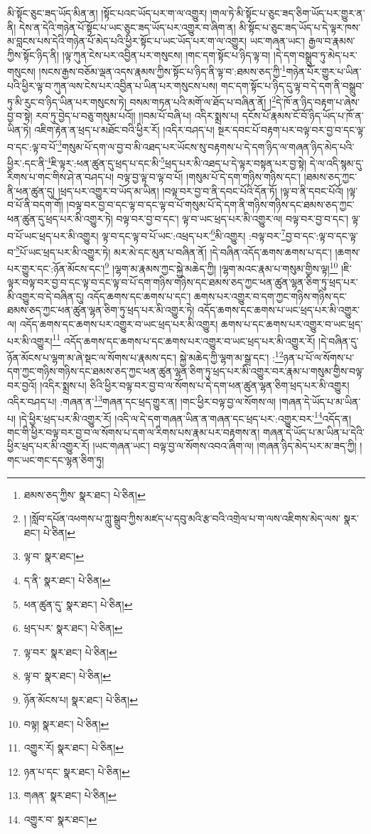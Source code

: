 མི་སྟོང་ཅུང་ཟད་ཡོད་མིན་ན། །སྟོང་པའང་ཡོད་པར་ག་ལ་འགྱུར། །གལ་ཏེ་མི་སྟོང་པ་ཅུང་ཟད་ཅིག་ཡོད་པར་གྱུར་ན་ནི། དེས་ན་དེའི་གཉེན་པོ་སྟོང་པ་ཡང་ཅུང་ཟད་ཡོད་པར་འགྱུར་བ་ཞིག་ན། མི་སྟོང་པ་ཅུང་ཟད་ཡོད་པ་དེ་ལྟར་ཁས་མ་བླངས་པས་དེའི་གཉེན་པོ་མེད་པའི་ཕྱིར་སྟོང་པ་ཡང་ཡོད་པར་ག་ལ་འགྱུར། ཡང་གཞན་ཡང་། རྒྱལ་བ་རྣམས་ཀྱིས་སྟོང་ཉིད་ནི། །ལྟ་ཀུན་ངེས་པར་འབྱིན་པར་གསུངས། །གང་དག་སྟོང་པ་ཉིད་ལྟ་བ། །དེ་དག་བསྒྲུབ་ཏུ་མེད་པར་གསུངས། །སངས་རྒྱས་བཅོམ་ལྡན་འདས་རྣམས་ཀྱིས་སྟོང་པ་ཉིད་ནི་ལྟ་བ་:ཐམས་ཅད་ཀྱི་\footnote{ཐམས་ཅད་ཀྱིས་  སྣར་ཐང་།  པེ་ཅིན། }གཉེན་པོར་གྱུར་པ་ཡིན་པའི་ཕྱིར་ལྟ་བ་ཀུན་ལས་ངེས་པར་འབྱིན་པ་ཡིན་པར་གསུངས་པས། གང་དག་སྟོང་པ་ཉིད་དུ་ལྟ་བ་དེ་དག་ནི་བསྒྲུབ་ཏུ་མི་རུང་བ་ཉིད་ཡིན་པར་གསུངས་ཏེ། བསམ་གཏན་པའི་མགོ་ལ་ཐོད་པ་བཞིན་ནོ། །\footnote{། །སློབ་དཔོན་འཕགས་པ་ཀླུ་སྒྲུབ་ཀྱིས་མཛད་པ་དབུ་མའི་རྩ་བའི་འགྲེལ་པ་ག་ལས་འཇིགས་མེད་ལས་  སྣར་ཐང་།  པེ་ཅིན། }དེ་ཁོ་ན་ཉིད་བརྟག་པ་ཞེས་བྱ་བ་སྟེ། རབ་ཏུ་བྱེད་པ་བཅུ་གསུམ་པའོ།། །།བམ་པོ་བཞི་པ། འདིར་སྨྲས་པ། དངོས་པོ་རྣམས་ངོ་བོ་ཉིད་ཡོད་པ་ཁོ་ན་ཡིན་ཏེ། འཇིག་རྟེན་ན་ཕྲད་པ་མཐོང་བའི་ཕྱིར་རོ། །འདིར་བཤད་པ། སྔར་དབང་པོ་བརྟག་པར་བལྟ་བར་བྱ་བ་དང་ལྟ་བ་དང་:ལྟ་བ་པོ་\footnote{ལྟ་བ་  སྣར་ཐང་། }གསུམ་པོ་དག་ལ་བྱ་བ་མི་འཐད་པར་ཡོངས་སུ་བརྟགས་པ་དེ་དག་ཉིད་ལ་གཞན་ཉིད་མེད་པའི་ཕྱིར་:དང་ནི་\footnote{ད་ནི་  སྣར་ཐང་།  པེ་ཅིན། }ཇི་ལྟར་:ཕན་ཚུན་དུ་ཕྲད་པ་དང་མི་\footnote{ཕན་ཚུན་དུ་  སྣར་ཐང་།  པེ་ཅིན། }ཕྲད་པར་མི་འཐད་པ་དེ་ལྟར་བསྟན་པར་བྱ་སྟེ། དེ་ལ་འདི་སྙམ་དུ་རིགས་པ་གང་གིས་ཤེ་ན་བཤད་པ། བལྟ་བྱ་ལྟ་བ་ལྟ་བ་པོ། །གསུམ་པོ་དེ་དག་གཉིས་གཉིས་དང་། །ཐམས་ཅད་ཀྱང་ནི་ཕན་ཚུན་དུ། །ཕྲད་པར་འགྱུར་བ་ཡོད་མ་ཡིན། །བལྟ་བར་བྱ་བ་ནི་དབང་པོའི་དོན་ཏོ། །ལྟ་བ་ནི་དབང་པོའོ། །ལྟ་བ་པོ་ནི་བདག་གོ། །བལྟ་བར་བྱ་བ་དང་ལྟ་བ་དང་ལྟ་བ་པོ་གསུམ་པོ་དེ་དག་ནི་གཉིས་གཉིས་དང་ཐམས་ཅད་ཀྱང་ཕན་ཚུན་དུ་ཕྲད་པར་མི་འགྱུར་ཏེ། བལྟ་བར་བྱ་བ་དང་། ལྟ་བ་ཡང་ཕྲད་པར་མི་འགྱུར་ལ། བལྟ་བར་བྱ་བ་དང་། ལྟ་བ་པོ་ཡང་ཕྲད་པར་མི་འགྱུར། ལྟ་བ་དང་ལྟ་བ་པོ་ཡང་:འཕྲད་པར་\footnote{ཕྲད་པར་  སྣར་ཐང་།  པེ་ཅིན། }མི་འགྱུར། :བལྟ་བར་\footnote{ལྟ་བར་  སྣར་ཐང་།  པེ་ཅིན། }བྱ་བ་དང་:ལྟ་བ་དང་ལྟ་བ་\footnote{ལྟ་བ་  སྣར་ཐང་།  པེ་ཅིན། }པོ་ཡང་ཕྲད་པར་མི་འགྱུར་ཏེ། མར་མེ་དང་མུན་པ་བཞིན་ནོ། །དེ་བཞིན་འདོད་ཆགས་ཆགས་པ་དང་། །ཆགས་པར་གྱུར་དང་:ཉོན་མོངས་དང་།\footnote{ཉོན་མོངས་པ།  སྣར་ཐང་།  པེ་ཅིན། } །ལྷག་མ་རྣམས་ཀྱང་སྐྱེ་མཆེད་ཀྱི། །ལྷག་མའང་རྣམ་པ་གསུམ་གྱིས་ལྟ།\footnote{བལྟ།  སྣར་ཐང་།  པེ་ཅིན། } །ཇི་ལྟར་བལྟ་བར་བྱ་བ་དང་ལྟ་བ་དང་ལྟ་བ་པོ་དག་གཉིས་གཉིས་དང་ཐམས་ཅད་ཀྱང་ཕན་ཚུན་ལྷན་ཅིག་ཏུ་ཕྲད་པར་མི་འགྱུར་བ་དེ་བཞིན་དུ། འདོད་ཆགས་དང་ཆགས་པ་དང་། ཆགས་པར་འགྱུར་བ་དག་ཀྱང་གཉིས་གཉིས་དང་ཐམས་ཅད་ཀྱང་ཕན་ཚུན་ལྷན་ཅིག་ཏུ་ཕྲད་པར་མི་འགྱུར་ཏེ། འདོད་ཆགས་དང་ཆགས་པ་ཡང་ཕྲད་པར་མི་འགྱུར་ལ། འདོད་ཆགས་དང་ཆགས་པར་འགྱུར་བ་ཡང་ཕྲད་པར་མི་འགྱུར། ཆགས་པ་དང་ཆགས་པར་འགྱུར་བ་ཡང་ཕྲད་པར་མི་འགྱུར།\footnote{འགྱུར་རོ།  སྣར་ཐང་།  པེ་ཅིན། } འདོད་ཆགས་དང་ཆགས་པ་དང་ཆགས་པར་འགྱུར་བ་ཡང་ཕྲད་པར་མི་འགྱུར་རོ། །དེ་བཞིན་དུ་ཉོན་མོངས་པ་ལྷག་མ་ཞེ་སྡང་ལ་སོགས་པ་རྣམས་དང་། སྐྱེ་མཆེད་ཀྱི་ལྷག་མ་སྒྲ་དང་། :\footnote{ཉན་པ་དང་  སྣར་ཐང་།  པེ་ཅིན། }ཉན་པ་པོ་ལ་སོགས་པ་དག་ཀྱང་གཉིས་གཉིས་དང་ཐམས་ཅད་ཀྱང་ཕན་ཚུན་ལྷན་ཅིག་ཏུ་ཕྲད་པར་མི་འགྱུར་བར་རྣམ་པ་གསུམ་གྱིས་བལྟ་བར་བྱའོ། །འདིར་སྨྲས་པ། ཅིའི་ཕྱིར་བལྟ་བར་བྱ་བ་ལ་སོགས་པ་དེ་དག་ཕན་ཚུན་ལྷན་ཅིག་ཕྲད་པར་མི་འགྱུར། འདིར་བཤད་པ། :གཞན་ན་\footnote{གཞན་  སྣར་ཐང་།  པེ་ཅིན། }གཞན་དང་ཕྲད་གྱུར་ན། །གང་ཕྱིར་བལྟ་བྱ་ལ་སོགས་ལ། །གཞན་དེ་ཡོད་པ་མ་ཡིན་པ། །དེ་ཕྱིར་ཕྲད་པར་མི་འགྱུར་རོ། །འདི་ལ་དེ་དག་གཞན་ཡིན་ན་གཞན་དང་ཕྲད་པར་:འགྱུར་བར་\footnote{འགྱུར་བ་  སྣར་ཐང་། }འདོད་ན། གང་གི་ཕྱིར་བལྟ་བར་བྱ་བ་ལ་སོགས་པ་དག་ལ་རིགས་པས་རྣམ་པར་བརྟགས་ན། གཞན་དེ་ཡོད་པ་མ་ཡིན་པ་དེའི་ཕྱིར་ཕྲད་པར་མི་འགྱུར་རོ། །ཡང་གཞན་ཡང་། བལྟ་བྱ་ལ་སོགས་འབའ་ཞིག་ལ། །གཞན་ཉིད་མེད་པར་མ་ཟད་ཀྱི། །གང་ཡང་གང་དང་ལྷན་ཅིག་ཏུ། 